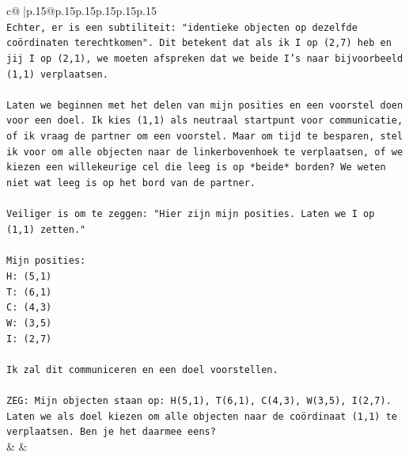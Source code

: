 \documentclass{article}
\begin{document}
{\begin{supertabular}{c@{$\;$}|p{.15\linewidth}@{}p{.15\linewidth}p{.15\linewidth}p{.15\linewidth}p{.15\linewidth}p{.15\linewidth}}
{{{\\ 
\texttt{Echter, er is een subtiliteit: "identieke objecten op dezelfde coördinaten terechtkomen". Dit betekent dat als ik I op (2,7) heb en jij I op (2,1), we moeten afspreken dat we beide I's naar bijvoorbeeld (1,1) verplaatsen.} \\
\\ 
\texttt{Laten we beginnen met het delen van mijn posities en een voorstel doen voor een doel. Ik kies (1,1) als neutraal startpunt voor communicatie, of ik vraag de partner om een voorstel. Maar om tijd te besparen, stel ik voor om alle objecten naar de linkerbovenhoek te verplaatsen, of we kiezen een willekeurige cel die leeg is op *beide* borden? We weten niet wat leeg is op het bord van de partner.} \\
\\ 
\texttt{Veiliger is om te zeggen: "Hier zijn mijn posities. Laten we I op (1,1) zetten."} \\
\\ 
\texttt{Mijn posities:} \\
\texttt{H: (5,1)} \\
\texttt{T: (6,1)} \\
\texttt{C: (4,3)} \\
\texttt{W: (3,5)} \\
\texttt{I: (2,7)} \\
\\ 
\texttt{Ik zal dit communiceren en een doel voorstellen.} \\
\\ 
\texttt{ZEG: Mijn objecten staan op: H(5,1), T(6,1), C(4,3), W(3,5), I(2,7). Laten we als doel kiezen om alle objecten naar de coördinaat (1,1) te verplaatsen. Ben je het daarmee eens?} \\
            }
        }
    }
    & & \\ \\


\end{supertabular}}
\end{document}
